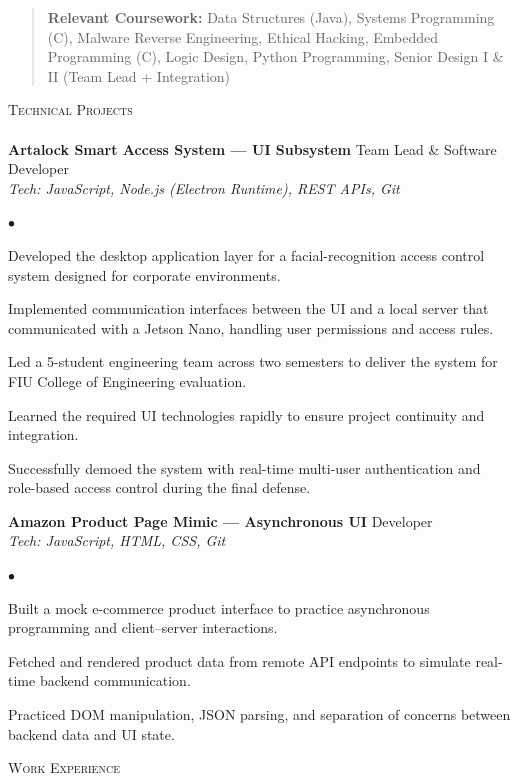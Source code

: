 \documentclass[a4paper]{article}
\newcommand{\lineunder}{
    \vspace*{-8pt}\\
    \hspace*{-18pt}\hrulefill\\
}
\newcommand{\header}[1]{
    {\hspace*{-18pt}\vspace*{6pt} \textsc{#1}}
    \vspace*{-6pt}\lineunder
}
\newenvironment{achievements}{
    \begin{list}
        {$\bullet$}{\topsep 0pt \itemsep -2pt}
    }{
        \vspace*{4pt}
    \end{list}
}
\newcommand{\area}[2]{
    \vspace*{-9pt}
    \begin{verse}
        \textbf{#1} #2
    \end{verse}
}
\begin{document}
\area{Relevant Coursework:}{
Data Structures (Java), Systems Programming (C), Malware Reverse Engineering, Ethical Hacking, Embedded Programming (C), Logic Design, Python Programming, Senior Design I \& II (Team Lead + Integration)
}

\header{Technical Projects}

\textbf{Artalock Smart Access System --- UI Subsystem} \hfill Team Lead \& Software Developer\\
\textit{Tech: JavaScript, Node.js (Electron Runtime), REST APIs, Git}\\[-4pt]
\begin{achievements}
    \item Developed the desktop application layer for a facial-recognition access control system designed for corporate environments.
    \item Implemented communication interfaces between the UI and a local server that communicated with a Jetson Nano, handling user permissions and access rules.
    \item Led a 5-student engineering team across two semesters to deliver the system for FIU College of Engineering evaluation.
    \item Learned the required UI technologies rapidly to ensure project continuity and integration.
    \item Successfully demoed the system with real-time multi-user authentication and role-based access control during the final defense.
\end{achievements}

\textbf{Amazon Product Page Mimic --- Asynchronous UI} \hfill Developer\\
\textit{Tech: JavaScript, HTML, CSS, Git}\\[-4pt]
\begin{achievements}
    \item Built a mock e-commerce product interface to practice asynchronous programming and client--server interactions.
    \item Fetched and rendered product data from remote API endpoints to simulate real-time backend communication.
    \item Practiced DOM manipulation, JSON parsing, and separation of concerns between backend data and UI state.
\end{achievements}

\header{Work Experience}
\end{document}
